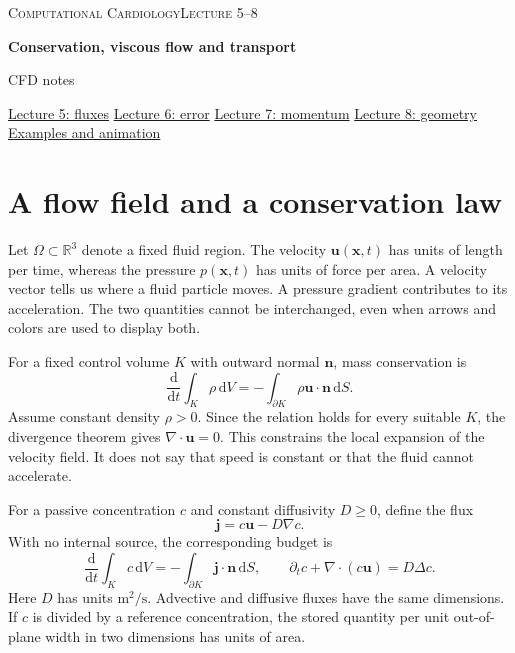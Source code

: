 \documentclass[11pt,letterpaper]{article}
\theoremstyle{definition}\newtheorem{definition}{Definition}\newtheorem{example}{Example}
\numberwithin{equation}{section}
\begin{document}
{\small\scshape Computational Cardiology\hfill Lecture 5--8}\par\medskip
{\raggedright{}\LARGE\bfseries\color{ink} Conservation, viscous flow and transport\par}\medskip
{\small CFD notes}\par\bigskip

\noindent\href{../../m05/slides.html}{Lecture 5: fluxes}\quad
\href{../../m06/slides.html}{Lecture 6: error}\quad
\href{../../m07/slides.html}{Lecture 7: momentum}\quad
\href{../../m08/slides.html}{Lecture 8: geometry}\quad
\href{index.html}{Examples and animation}

\section{A flow field and a conservation law}
Let $\Omega\subset\mathbb R^3$ denote a fixed fluid region. The velocity $\boldsymbol u(\boldsymbol x,t)$ has units of length per time, whereas the pressure $p(\boldsymbol x,t)$ has units of force per area. A velocity vector tells us where a fluid particle moves. A pressure gradient contributes to its acceleration. The two quantities cannot be interchanged, even when arrows and colors are used to display both.

For a fixed control volume $K$ with outward normal $\boldsymbol n$, mass conservation is
\begin{equation}\frac{\mathrm d}{\mathrm dt}\int_K\rho\,\mathrm dV
=-\int_{\partial K}\rho\boldsymbol u\cdot\boldsymbol n\,\mathrm dS.\end{equation}
Assume constant density $\rho>0$. Since the relation holds for every suitable $K$, the divergence theorem gives $\nabla\cdot\boldsymbol u=0$. This constrains the local expansion of the velocity field. It does not say that speed is constant or that the fluid cannot accelerate.

For a passive concentration $c$ and constant diffusivity $D\ge0$, define the flux
\begin{equation}\boldsymbol j=c\boldsymbol u-D\nabla c.\end{equation}
With no internal source, the corresponding budget is
\begin{equation}\frac{\mathrm d}{\mathrm dt}\int_K c\,\mathrm dV
=-\int_{\partial K}\boldsymbol j\cdot\boldsymbol n\,\mathrm dS,
\qquad \partial_t c+\nabla\cdot(c\boldsymbol u)=D\Delta c.\end{equation}
Here $D$ has units $\mathrm{m^2/s}$. Advective and diffusive fluxes have the same dimensions. If $c$ is divided by a reference concentration, the stored quantity per unit out-of-plane width in two dimensions has units of area.
\end{document}
